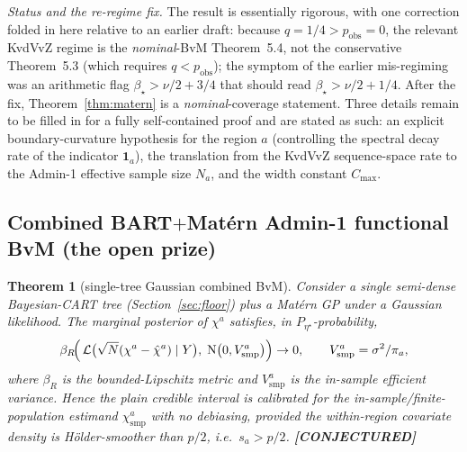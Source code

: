 \documentclass[11pt]{article}
\newtheorem{theorem}{Theorem}
\theoremstyle{remark}
\newcommand{\CONJ}{\textnormal{\textbf{\textcolor{orange!75!black}{[CONJECTURED]}}}}
\newcommand{\N}{\mathrm{N}}
\newcommand{\chia}{\chi^a}
\newcommand{\Vsmp}{V^a_{\mathrm{smp}}}
\begin{document}
\noindent\emph{Status and the re-regime fix.} The result is essentially rigorous,
with one correction folded in here relative to an earlier draft: because
$q=1/4 > p_{\mathrm{obs}}=0$, the relevant KvdVvZ regime is the
\emph{nominal}-BvM Theorem~5.4, not the conservative Theorem~5.3 (which requires
$q<p_{\mathrm{obs}}$); the symptom of the earlier
mis-regiming was an arithmetic flag $\beta_\star > \nu/2+3/4$ that should read
$\beta_\star>\nu/2+1/4$. After the fix, Theorem~\ref{thm:matern} is a
\emph{nominal}-coverage statement. Three details remain to be filled in for a
fully self-contained proof and are stated as such: an explicit boundary-curvature
hypothesis for the region $a$ (controlling the spectral decay rate of the
indicator $\mathbf 1_a$), the translation from the KvdVvZ sequence-space rate to
the Admin-1 effective sample size $N_a$, and the width constant $C_{\max}$.

\subsection{\texorpdfstring{Combined BART$+$Mat\'ern Admin-1 functional BvM (the open prize)}{Combined BART+Matern Admin-1 functional BvM (the open prize)}}

\begin{theorem}[single-tree Gaussian combined BvM]\label{thm:combined}
Consider a single semi-dense Bayesian-CART tree (Section~\ref{sec:floor}) plus a
Mat\'ern GP under a Gaussian likelihood. The marginal posterior of $\chia$
satisfies, in $P_{\eta^\star}$-probability,
\begin{equation}\label{eq:combinedbvm}
\beta_R\!\Bigl(\,\mathcal L\bigl(\sqrt N(\chia - \hat\chi^a)\mid Y\bigr),\;
\N\bigl(0, \Vsmp\bigr)\Bigr)\to 0,
\qquad \Vsmp = \sigma^2/\pi_a ,
\end{equation}
where $\beta_R$ is the bounded-Lipschitz metric and $\Vsmp$ is the
\emph{in-sample} efficient variance. Hence the plain credible interval is
calibrated for the in-sample/finite-population estimand $\chia_{\mathrm{smp}}$
\emph{with no debiasing}, provided the within-region covariate density is
H\"older-smoother than $p/2$, i.e.\ $s_a > p/2$. \CONJ
\end{theorem}
\end{document}
